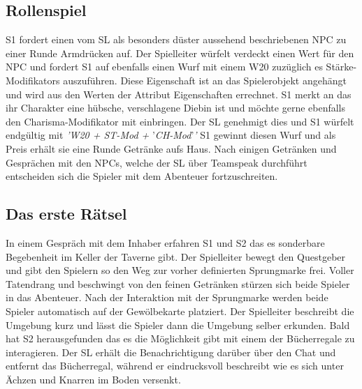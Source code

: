 \subsection{Rollenspiel}
\label{sec:Rollenspiel}

S1 fordert einen vom SL als besonders düster aussehend beschriebenen NPC zu einer Runde Armdrücken auf.\newline
Der Spielleiter würfelt verdeckt einen Wert für den NPC und fordert S1 auf ebenfalls einen Wurf mit einem W20 zuzüglich es Stärke-Modifikators auszuführen. Diese Eigenschaft ist an das Spielerobjekt angehängt und wird aus den Werten der Attribut Eigenschaften errechnet. S1 merkt an das ihr Charakter eine hübsche, verschlagene Diebin ist und möchte gerne ebenfalls den Charisma-Modifikator mit einbringen. Der SL genehmigt dies und S1 würfelt endgültig mit \emph{'W20 + ST-Mod + }'\emph{CH-Mod}'\emph{'}\newline
S1 gewinnt diesen Wurf und als Preis erhält sie eine Runde Getränke aufs Haus.\newline
Nach einigen Getränken und Gesprächen mit den NPCs, welche der SL über Teamspeak durchführt entscheiden sich die Spieler mit dem Abenteuer fortzuschreiten. 

\subsection{Das erste Rätsel}
\label{sec:DasErsteRätsel}

In einem Gespräch mit dem Inhaber erfahren S1 und S2 das es sonderbare Begebenheit im Keller der Taverne gibt. Der Spielleiter bewegt den Questgeber und gibt den Spielern so den Weg zur vorher definierten Sprungmarke frei.\newline
Voller Tatendrang und beschwingt von den feinen Getränken stürzen sich beide Spieler in das Abenteuer.
Nach der Interaktion mit der Sprungmarke werden beide Spieler automatisch auf der Gewölbekarte platziert. Der Spielleiter beschreibt die Umgebung kurz und lässt die Spieler dann die Umgebung selber erkunden. Bald hat S2 herausgefunden das es die Möglichkeit gibt mit einem der Bücherregale zu interagieren. Der SL erhält die Benachrichtigung darüber über den Chat und entfernt das Bücherregal, während er eindrucksvoll beschreibt wie es sich unter Ächzen und Knarren im Boden versenkt.\newline


